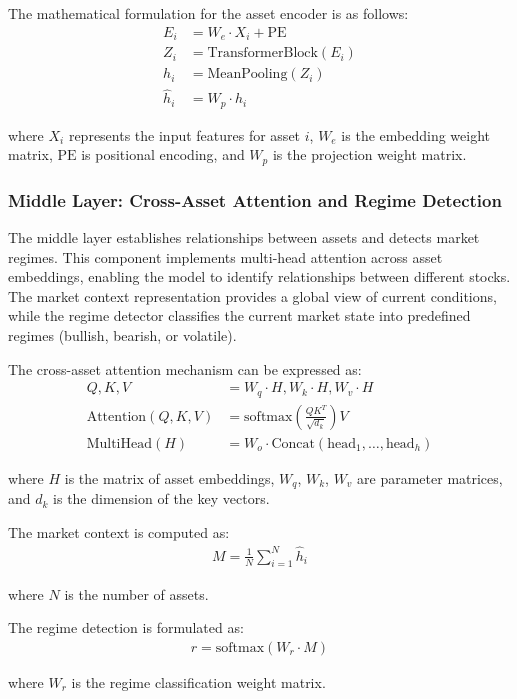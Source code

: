 \documentclass[conference]{IEEEtran}
\begin{document}
The mathematical formulation for the asset encoder is as follows:
\begin{align}
E_i &= W_e \cdot X_i + \text{PE} \\
Z_i &= \text{TransformerBlock}(E_i) \\
h_i &= \text{MeanPooling}(Z_i) \\
\hat{h}_i &= W_p \cdot h_i
\end{align}

where $X_i$ represents the input features for asset $i$, $W_e$ is the embedding weight matrix, $\text{PE}$ is positional encoding, and $W_p$ is the projection weight matrix.

\subsubsection{Middle Layer: Cross-Asset Attention and Regime Detection}
The middle layer establishes relationships between assets and detects market regimes. This component implements multi-head attention across asset embeddings, enabling the model to identify relationships between different stocks. The market context representation provides a global view of current conditions, while the regime detector classifies the current market state into predefined regimes (bullish, bearish, or volatile).

The cross-asset attention mechanism can be expressed as:
\begin{align}
Q, K, V &= W_q \cdot H, W_k \cdot H, W_v \cdot H \\
\text{Attention}(Q, K, V) &= \text{softmax}\left(\frac{QK^T}{\sqrt{d_k}}\right)V \\
\text{MultiHead}(H) &= W_o \cdot \text{Concat}(\text{head}_1, \ldots, \text{head}_h)
\end{align}

where $H$ is the matrix of asset embeddings, $W_q$, $W_k$, $W_v$ are parameter matrices, and $d_k$ is the dimension of the key vectors.

The market context is computed as:
\begin{align}
M = \frac{1}{N} \sum_{i=1}^{N} \hat{h}_i
\end{align}

where $N$ is the number of assets.

The regime detection is formulated as:
\begin{align}
r = \text{softmax}(W_r \cdot M)
\end{align}

where $W_r$ is the regime classification weight matrix.
\end{document}

